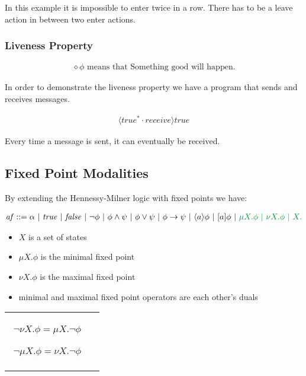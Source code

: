 \documentclass{clseminar}
\begin{document}
  In this example it is impossible to enter twice in a row. There has to be a leave action in
  between two enter actions.

  \pagebreak
  \subsubsection{Liveness Property}

  \begin{align*}
    \diamond\phi \text{ means that Something good will happen.}
  \end{align*}

  In order to demonstrate the liveness property we have a program that sends and receives messages.

  \begin{align*}
    [\mathit{true}^*\cdot \mathit{send}]\langle \mathit{true}^* \cdot \mathit{receive} \rangle \mathit{true}
  \end{align*}

  Every time a message is sent, it can eventually be received.

  \subsection{Fixed Point Modalities}

  By extending the Hennessy-Milner logic with fixed points we have:

  \begin{align*}
    \mathit{af} ::= \alpha\ |\ \mathit{true}\ |\ \mathit{false}\ |\ \neg \phi\ |\ \phi \land \psi\ |\ \phi \lor \psi\ |\ \phi \to \psi\ |\ \langle a \rangle \phi \ |\ [a]\phi\ |\ \color{green} \mu X. \phi \ |\ \nu X. \phi \ |\ X.
  \end{align*}

  \begin{itemize}
    \item $X$ is a set of states
    \item $\mu X. \phi$ is the minimal fixed point
    \item $\nu X. \phi$ is the maximal fixed point
    \item minimal and maximal fixed point operators are each other's duals
  \end{itemize}
  \begin{tabular}{cc}
    \begin{minipage}{.47\linewidth}
      \begin{align*}
        \neg \nu X. \phi = \mu X. \neg \phi
      \end{align*}
    \end{minipage}
    \begin{minipage}{.47\linewidth}
      \begin{align*}
        \neg \mu X. \phi = \nu X. \neg \phi
      \end{align*}
    \end{minipage}
  \end{tabular}
\end{document}
